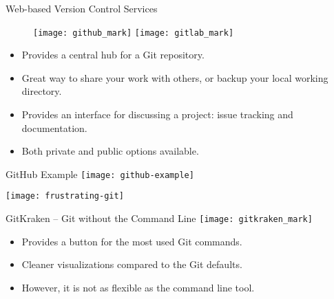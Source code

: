 \documentclass{beamer}
\begin{document}
%
% 
%
%
%
\begin{frame}{Web-based Version Control Services}
  \begin{figure}
    \center
    \texttt{[image: github\_mark]}
    \texttt{[image: gitlab\_mark]}
  \end{figure}

  \begin{itemize}
    \item Provides a central hub for a Git repository.

    \item Great way to share your work with others, or backup your local working directory.

    \item Provides an interface for discussing a project: issue tracking and documentation.

    \item Both private and public options available.
  \end{itemize}
\end{frame}

\begin{frame}{GitHub Example}
  \center
  \texttt{[image: github-example]}
\end{frame}

\begin{frame}{}
  \center
  \texttt{[image: frustrating-git]}
\end{frame}

\begin{frame}{GitKraken -- Git without the Command Line}
  \center \texttt{[image: gitkraken\_mark]}

  \begin{itemize}
    \item Provides a button for the most used Git commands.

    \item Cleaner visualizations compared to the Git defaults.

    \item However, it is not as flexible as the command line tool.
  \end{itemize}
\end{frame}
\end{document}
